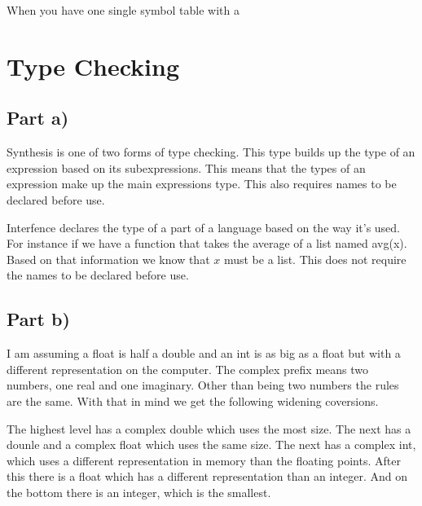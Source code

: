 \documentclass[paper=a4, fontsize=11pt]{scrartcl} %
\numberwithin{equation}{section} %
\numberwithin{figure}{section} %
\numberwithin{table}{section} %
\begin{document}
When you have one single symbol table with a 
\section{Type Checking}
\subsection{Part a)}
Synthesis is one of two forms of type checking.
This type builds up the type of an expression based on its subexpressions.
This means that the types of an expression make up the main expressions type.
This also requires names to be declared before use.

Interfence declares the type of a part of a language based on the way it's used.
For instance if we have a function that takes the average of a list named avg(x).
Based on that information we know that $x$ must be a list.
This does not require the names to be declared before use.
\subsection{Part b)}
I am assuming a float is half a double and an int is as big as a float but with a different representation on the computer.
The complex prefix means two numbers, one real and one imaginary. Other than being two numbers the rules are the same.
With that in mind we get the following widening coversions.

The highest level has a complex double which uses the most size.
The next has a dounle and a complex float which uses the same size.
The next has a complex int, which uses a different representation in memory than the floating points.
After this there is a float which has a different representation than an integer.
And on the bottom there is an integer, which is the smallest.
\end{document}
